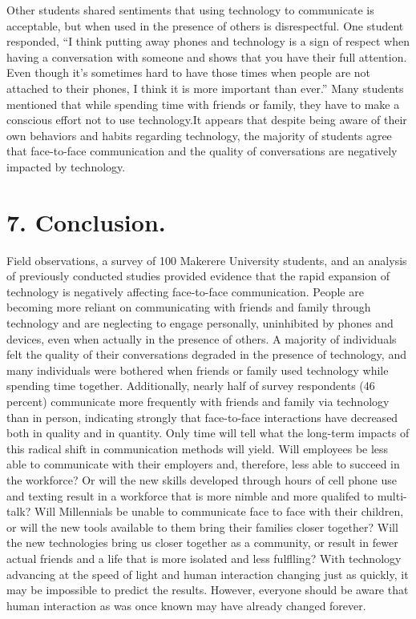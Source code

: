\documentclass[11pt]{article} %
\begin{document}
Other students shared sentiments that using technology to communicate is acceptable, but when 
used in the presence of others is disrespectful. One student responded, “I think putting away phones and 
technology is a sign of respect when having a conversation with someone and shows that you have their 
full attention. Even though it’s sometimes hard to have those times when people are not attached to their 
phones, I think it is more important than ever.” Many students mentioned that while spending time with friends 
or family, they have to make a conscious effort not to use technology.It appears that despite being 
aware of their own behaviors and habits regarding technology, the majority of students agree that face-to-face 
communication and the quality of conversations are negatively impacted by technology.

\section{7. Conclusion.}
Field observations, a survey of 100 Makerere University students, and an analysis of previously conducted studies 
provided evidence that the rapid expansion of technology is negatively affecting face-to-face communication. 
People are becoming more reliant on communicating with friends and family through technology and are 
neglecting to engage personally, uninhibited by phones and devices, even when actually in the presence of 
others. A majority of individuals felt the quality of their conversations degraded in the presence of technology, 
and many individuals were bothered when friends or family used technology while spending time together. 
Additionally, nearly half of survey respondents (46 percent) communicate more frequently with friends and family 
via technology than in person, indicating strongly that face-to-face interactions have decreased both in quality 
and in quantity.
Only time will tell what the long-term impacts of this radical shift in communication methods will yield. 
Will employees be less able to communicate with their employers and, therefore, less able to succeed in the workforce? Or will the new skills developed through hours of cell phone use and texting result in a workforce 
that is more nimble and more qualifed to multi-talk? Will Millennials be unable to communicate face to face 
with their children, or will the new tools available to them bring their families closer together? Will the new 
technologies bring us closer together as a community, or result in fewer actual friends and a life that is more 
isolated and less fulflling? With technology advancing at the speed of light and human interaction changing 
just as quickly, it may be impossible to predict the results. However, everyone should be aware that human 
interaction as was once known may have already changed forever.
\end{document}
